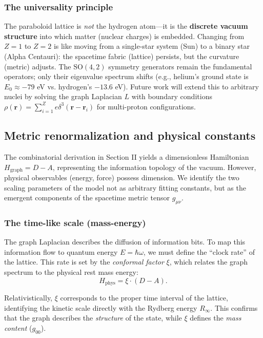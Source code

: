 \documentclass[aps,prd,twocolumn,superscriptaddress,groupedaddress,showpacs]{revtex4-2}
\newcommand{\SO}{\ensuremath{\text{SO}}}
\begin{document}
\subsubsection{The universality principle}

The paraboloid lattice is \emph{not} the hydrogen atom---it is the \textbf{discrete vacuum structure} into which matter (nuclear charges) is embedded. Changing from $Z=1$ to $Z=2$ is like moving from a single-star system (Sun) to a binary star (Alpha Centauri): the spacetime fabric (lattice) persists, but the curvature (metric) adjusts. The $\SO(4,2)$ symmetry generators remain the fundamental operators; only their eigenvalue spectrum shifts (e.g., helium's ground state is $E_0 \approx -79$ eV vs. hydrogen's $-13.6$ eV). Future work will extend this to arbitrary nuclei by solving the graph Laplacian $L$ with boundary conditions $\rho(\mathbf{r}) = \sum_{i=1}^Z e \delta^3(\mathbf{r} - \mathbf{r}_i)$ for multi-proton configurations.

\subsection{Metric renormalization and physical constants}

The combinatorial derivation in Section II yields a dimensionless Hamiltonian $H_{\text{graph}} = D - A$, representing the information topology of the vacuum. However, physical observables (energy, force) possess dimension. We identify the two scaling parameters of the model not as arbitrary fitting constants, but as the emergent components of the spacetime metric tensor $g_{\mu\nu}$.

\subsubsection{The time-like scale (mass-energy)}

The graph Laplacian describes the diffusion of information bits. To map this information flow to quantum energy $E = \hbar \omega$, we must define the ``clock rate'' of the lattice. This rate is set by the \emph{conformal factor} $\xi$, which relates the graph spectrum to the physical rest mass energy:
\begin{equation}
H_{\text{phys}} = \xi \cdot (D - A).
\end{equation}

Relativistically, $\xi$ corresponds to the proper time interval of the lattice, identifying the kinetic scale directly with the Rydberg energy $R_\infty$. This confirms that the graph describes the \emph{structure} of the state, while $\xi$ defines the \emph{mass content} ($g_{00}$).
\end{document}
